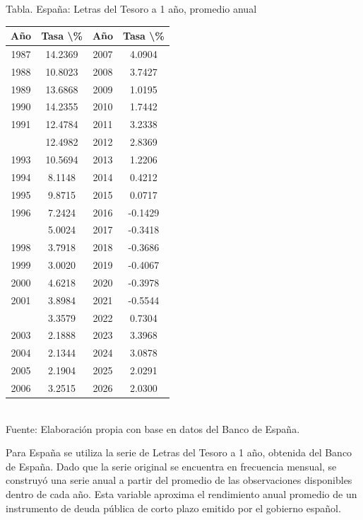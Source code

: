 \documentclass{article}\usepackage[]{graphicx}\usepackage[]{xcolor}
\begin{document}
\begin{center}
Tabla. España: Letras del Tesoro a 1 año, promedio anual
\end{center}
\begin{center}

\begin{tabular}{cccc}
\toprule
Año & Tasa \textbackslash{}\% & Año & Tasa \textbackslash{}\%\\
\midrule
1987 & 14.2369 & 2007 & 4.0904\\
1988 & 10.8023 & 2008 & 3.7427\\
1989 & 13.6868 & 2009 & 1.0195\\
1990 & 14.2355 & 2010 & 1.7442\\
1991 & 12.4784 & 2011 & 3.2338\\
\addlinespace
1992 & 12.4982 & 2012 & 2.8369\\
1993 & 10.5694 & 2013 & 1.2206\\
1994 & 8.1148 & 2014 & 0.4212\\
1995 & 9.8715 & 2015 & 0.0717\\
1996 & 7.2424 & 2016 & -0.1429\\
\addlinespace
1997 & 5.0024 & 2017 & -0.3418\\
1998 & 3.7918 & 2018 & -0.3686\\
1999 & 3.0020 & 2019 & -0.4067\\
2000 & 4.6218 & 2020 & -0.3978\\
2001 & 3.8984 & 2021 & -0.5544\\
\addlinespace
2002 & 3.3579 & 2022 & 0.7304\\
2003 & 2.1888 & 2023 & 3.3968\\
2004 & 2.1344 & 2024 & 3.0878\\
2005 & 2.1904 & 2025 & 2.0291\\
2006 & 3.2515 & 2026 & 2.0300\\
\bottomrule
\end{tabular}
\\[0.3em]
{\footnotesize Fuente: Elaboración propia con base en datos del Banco de España.}
\end{center}


Para España se utiliza la serie de Letras del Tesoro a 1 año, obtenida del Banco de España. Dado que la serie original se encuentra en frecuencia mensual, se construyó una serie anual a partir del promedio de las observaciones disponibles dentro de cada año. Esta variable aproxima el rendimiento anual promedio de un instrumento de deuda pública de corto plazo emitido por el gobierno español.
\end{document}
